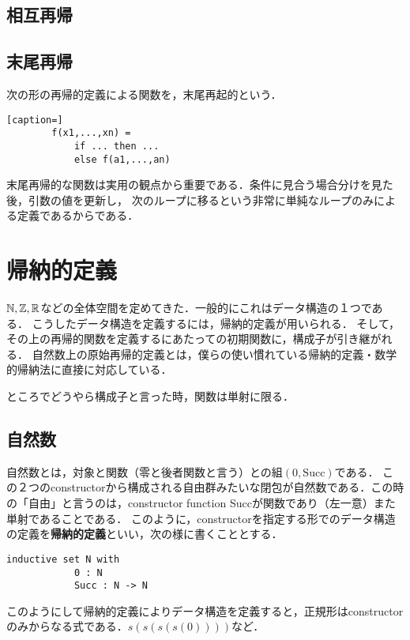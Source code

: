 \documentclass[uplatex, 12pt, dvipdfmx]{jsreport}
\begin{document}
\subsection{相互再帰}

\subsection{末尾再帰}

\begin{definition}[末尾再帰関数]
    次の形の再帰的定義による関数を，末尾再起的という．
    \begin{lstlisting}[caption=]
        f(x1,...,xn) =
            if ... then ...
            else f(a1,...,an)
    \end{lstlisting}
\end{definition}
\begin{remark}
    末尾再帰的な関数は実用の観点から重要である．条件に見合う場合分けを見た後，引数の値を更新し，
    次のループに移るという非常に単純なループのみによる定義であるからである．
\end{remark}

\section{帰納的定義}

$\mathbb{N},\mathbb{Z},\mathbb{R}$などの全体空間を定めてきた．一般的にこれはデータ構造の１つである．
こうしたデータ構造を定義するには，帰納的定義が用いられる．
そして，その上の再帰的関数を定義するにあたっての初期関数に，構成子が引き継がれる．
自然数上の原始再帰的定義とは，僕らの使い慣れている帰納的定義・数学的帰納法に直接に対応している．

ところでどうやら構成子と言った時，関数は単射に限る．

\subsection{自然数}
\begin{definition}
    自然数とは，対象と関数（零と後者関数と言う）との組$(0,\mathrm{Succ})$である．
    この２つのconstructorから構成される自由群みたいな閉包が自然数である．この時の「自由」と言うのは，constructor function Succが関数であり（左一意）また単射であることである．
    このように，constructorを指定する形でのデータ構造の定義を\textbf{帰納的定義}といい，次の様に書くこととする．
    \begin{lstlisting}[caption=inductive definition]
        inductive set N with
            0 : N
            Succ : N -> N
    \end{lstlisting}
\end{definition}
\begin{remark}
    このようにして帰納的定義によりデータ構造を定義すると，正規形はconstructorのみからなる式である．$s(s(s(s(0))))$など．
\end{remark}
\end{document}
